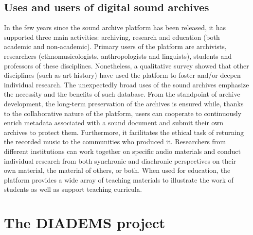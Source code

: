 \documentclass[final, hyperref, table]{beamer}
\begin{document}
\subsection{ Uses and users of digital sound archives}
\begin{frame}
  In the few years since the sound archive platform has been released,
  it has supported three main activities: archiving, research and
  education (both academic and non-academic). Primary users of the
  platform are archivists, researchers (ethnomusicologists,
  anthropologists and linguists), students and professors of these
  disciplines. Nonetheless, a qualitative survey showed that other
  disciplines (such as art history) have used the platform to foster
  and/or deepen individual research. The unexpectedly broad uses of
  the sound archives emphasize the necessity and the benefits of such
  database.  From the standpoint of archive development, the long-term
  preservation of the archives is ensured while, thanks to the
  collaborative nature of the platform, users can cooperate to
  continuously enrich metadata associated with a sound document and
  submit their own archives to protect them. Furthermore, it
  facilitates the ethical task of returning the recorded music to the
  communities who produced it.  Researchers from different
  institutions can work together on specific audio materials and
  conduct individual research from both synchronic and diachronic
  perspectives on their own material, the material of others, or both.
  When used for education, the platform provides a wide array of
  teaching materials to illustrate the work of students as well as
  support teaching curricula.
\end{frame}
\section[The DIADEMS project]{The DIADEMS project}\label{sec:Diadems}
\end{document}
